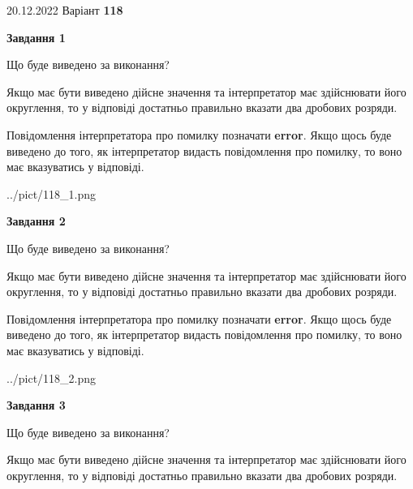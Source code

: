 \documentclass[12pt, ukrainian]{article}
\begin{document}
{20.12.2022 Варіант \No \textbf { 118 }\par}
{
\begin {Large}

{\begin {center}\textbf{Завдання 1}\end {center}}\par
Що буде виведено за виконання? \par

Якщо має бути виведено дійсне значення та інтерпретатор має здійснювати його округлення, 
то у відповіді достатньо правильно вказати два дробових розряди.

Повідомлення інтерпретатора про помилку позначати \textbf{error}.
Якщо щось буде виведено до того, як інтерпретатор видасть повідомлення про помилку, 
то воно має вказуватись у відповіді. \par

\begin{center}
	{../pict/118_1.png}
\end{center}
\newpage

{\begin {center}\textbf{Завдання 2}\end {center}}\par
Що буде виведено за виконання? \par

Якщо має бути виведено дійсне значення та інтерпретатор має здійснювати його округлення, 
то у відповіді достатньо правильно вказати два дробових розряди.

Повідомлення інтерпретатора про помилку позначати \textbf{error}.
Якщо щось буде виведено до того, як інтерпретатор видасть повідомлення про помилку, 
то воно має вказуватись у відповіді. \par

\begin{center}
	{../pict/118_2.png}
\end{center}
\newpage

{\begin {center}\textbf{Завдання 3}\end {center}}\par
Що буде виведено за виконання? \par

Якщо має бути виведено дійсне значення та інтерпретатор має здійснювати його округлення, 
то у відповіді достатньо правильно вказати два дробових розряди.


\end{Large}}
\end{document}
